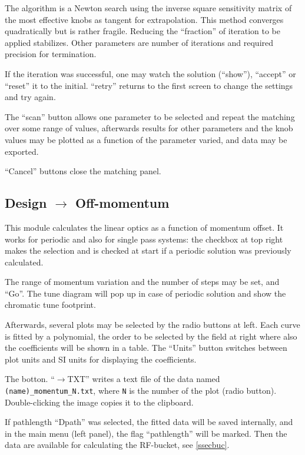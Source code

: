 \documentclass[12pt]{article}
\begin{document}
The algorithm is a Newton search using the
inverse square sensitivity matrix of the most effective knobs as tangent
for extrapolation.
This method converges quadratically but is rather fragile.
Reducing the ``fraction'' of iteration to be applied stabilizes.
Other parameters are number of iterations and required precision for termination.

If the iteration was successful, one may watch the solution (``show''), ``accept''
or ``reset'' it to the initial. ``retry'' returns to the first screen to change
the settings and try again.

The ``scan'' button allows one parameter to be selected and repeat the matching over some range of values, afterwards results for other parameters and the knob values may be plotted as a function of the parameter varied, and data may be exported.

``Cancel'' buttons close the matching panel.



\subsection{\label{ssecmom}Design $\longrightarrow$ Off-momentum}

This module calculates the linear optics as a function of momentum offset.
It works for periodic and also for single pass systems: the
checkbox at top right makes the selection and is checked at start if a periodic
solution was previously calculated.

The range of momentum variation and the number of steps may be set, and ``Go''. The tune diagram will pop up in case of periodic solution and show the chromatic tune footprint.

Afterwards, several plots may be selected by the radio buttons at left.
Each curve is fitted by a polynomial, the order to be selected by the
field at right where also the coefficients will be shown in a table.
The ``Units'' button switches between plot units and SI units for displaying
the coefficients.


The botton. ``$\rightarrow$TXT'' writes a text file of the data named
{\tt (name)\_momentum\_N.txt}, where {\tt N} is
the number of the plot (radio button).
Double-clicking the image copies it to the clipboard.

If pathlength ``Dpath'' was selected, the fitted data will be saved internally, and in the main menu (left panel), the flag ``pathlength'' will be marked. Then the data are available for calculating the RF-bucket, see \ref{ssecbuc}.
\end{document}
